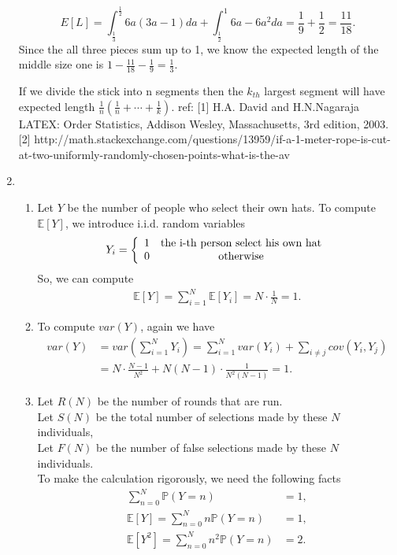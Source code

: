 \documentclass[10pt]{article}
\begin{document}
\begin{enumerate}
\begin{equation}
E[L]=\int_{\frac{1}{3}}^{\frac{1}{2}}6a(3a-1)da + \int_{\frac{1}{2}}^{1}6a-6a^{2}da = \frac{1}{9}+\frac{1}{2}=\frac{11}{18}.\nonumber 
\end{equation}
Since the all three pieces sum up to 1, we know the expected length of the middle size one is $1-\frac{11}{18}-\frac{1}{9}=\frac{1}{3}$.

If we divide the stick into n segments then the $k_{th}$ largest segment will have expected length $\frac{1}{n}(\frac{1}{n}+\cdots+\frac{1}{k})$\cite{os}\cite{stack}.
ref: 
[1] H.A. David and H.N.Nagaraja LATEX: Order Statistics, Addison Wesley, Massachusetts, 3rd edition, 2003.
[2] http://math.stackexchange.com/questions/13959/if-a-1-meter-rope-is-cut-at-two-uniformly-randomly-chosen-points-what-is-the-av

\item %
\begin{enumerate}
\item Let $Y$ be the number of people who select their own hats. To compute $\mathbb{E}[Y]$, we introduce i.i.d. random variables
\[ Y_i = \left\{ \begin{array}{cc}
1 & \textup{the i-th person select his own hat} \\
0 & \textup{otherwise}
\end{array} \right.\]
So, we can compute
\begin{align*}
\mathbb{E}[Y] = \sum_{i = 1}^N\mathbb{E}[Y_i] = N\cdot \frac{1}{N} = 1.
\end{align*}

\item To compute $var(Y)$, again we have
\begin{align*}
var(Y) 
&= var\left(\sum_{i = 1}^NY_i\right) = \sum_{i=1}^Nvar(Y_i) + \sum_{i\neq j}cov(Y_i, Y_j) \\
& = N\cdot\frac{N-1}{N^2} + N(N-1)\cdot\frac{1}{N^2(N-1)} = 1.
\end{align*}

\item Let $R(N)$ be the number of rounds that are run.\\
Let $S(N)$ be the total number of selections made by these $N$ individuals, \\
Let $F(N)$ be the number of false selections made by these $N$ individuals.\\
To make the calculation rigorously, we need the following facts
\begin{align*}
\sum_{n = 0}^N\mathbb{P}(Y = n) &= 1,\\
\mathbb{E}[Y] = \sum_{n=0}^Nn\mathbb{P}(Y = n) &= 1,\\
\mathbb{E}[Y^2] = \sum_{n=0}^Nn^2\mathbb{P}(Y=n) & = 2.
\end{align*}


\end{enumerate}
\end{enumerate}
\end{document}

